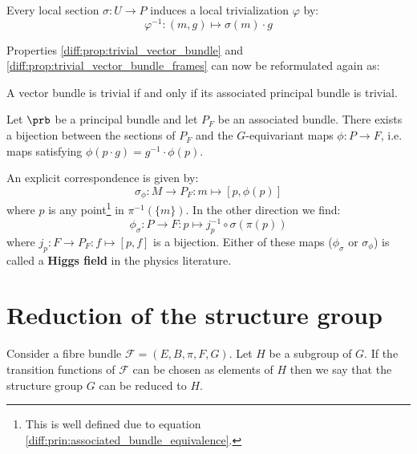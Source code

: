 	\begin{result}\label{diff:prin_section_triv}
		Every local section $\sigma:U\rightarrow P$ induces a local trivialization $\varphi$ by:
		\begin{equation}
			\varphi^{-1}:(m, g)\mapsto \sigma(m)\cdot g
		\end{equation}
	\end{result}
	
	Properties \ref{diff:prop:trivial_vector_bundle} and \ref{diff:prop:trivial_vector_bundle_frames} can now be reformulated again as:
	\begin{theorem}
		A vector bundle is trivial if and only if its associated principal bundle is trivial.
	\end{theorem}
	
	\begin{property}\label{diff:prin:section_bijection}
		Let $\prb$ be a principal bundle and let $P_F$ be an associated bundle. There exists a bijection between the sections of $P_F$ and the $G$-equivariant maps $\phi:P\rightarrow F$, i.e. maps satisfying $\phi(p\cdot g) = g^{-1}\cdot\phi(p)$.
		
		An explicit correspondence is given by:
		\begin{equation}
			\sigma_\phi:M\rightarrow P_F:m\mapsto [p, \phi(p)]
		\end{equation}
		where $p$ is any point\footnote{This is well defined due to equation \ref{diff:prin:associated_bundle_equivalence}.} in $\pi^{-1}(\{m\})$. In the other direction we find:
		\begin{equation}
			\label{diff:prin:section_bijection_phi}
			\phi_\sigma:P\rightarrow F: p\mapsto j_p^{-1}\circ\sigma(\pi(p))
		\end{equation}
		where $j_p:F\rightarrow P_F:f\mapsto[p, f]$ is a bijection. Either of these maps ($\phi_\sigma$ or $\sigma_\phi$) is called a \textbf{Higgs field} in the physics literature.
	\end{property}

\section{Reduction of the structure group}

	\begin{construct}
		Consider a fibre bundle $\mathcal{F} = (E, B, \pi, F, G)$. Let $H$ be a subgroup of $G$. If the transition functions of $\mathcal{F}$ can be chosen as elements of $H$ then we say that the structure group $G$ can be reduced to $H$.
	\end{construct}
	
